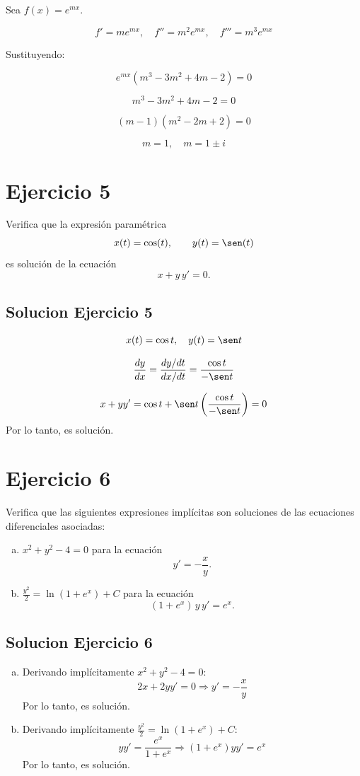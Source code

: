 \documentclass[12pt]{article}
\begin{document}
Sea $f(x)=e^{mx}$.

\[
f'=me^{mx},\quad f''=m^2e^{mx},\quad f'''=m^3e^{mx}
\]

Sustituyendo:

\[
e^{mx}(m^3-3m^2+4m-2)=0
\]

\[
m^3-3m^2+4m-2=0
\]

\[
(m-1)(m^2-2m+2)=0
\]

\[
\boxed{m=1,\quad m=1\pm i}
\]
\section*{Ejercicio 5}

Verifica que la expresión paramétrica
\[
x(t) = \cos(t), \qquad y(t) = \sen(t)
\]
es solución de la ecuación
\[
x + y\,y' = 0.
\]

\subsection*{Solucion Ejercicio 5}
\[
x(t)=\cos t,\quad y(t)=\sen t
\]

\[
\frac{dy}{dx}=\frac{dy/dt}{dx/dt}=\frac{\cos t}{-\sen t}
\]

\[
x + yy' = \cos t + \sen t\left(\frac{\cos t}{-\sen t}\right)=0
\]
Por lo tanto, es solución.

\section*{Ejercicio 6}

Verifica que las siguientes expresiones implícitas son soluciones de las ecuaciones diferenciales asociadas:

\begin{enumerate}[a)]
\item $x^2 + y^2 - 4 = 0$ para la ecuación
\[
y' = -\frac{x}{y}.
\]

\item $\displaystyle \frac{y^2}{2} = \ln(1 + e^x) + C$ para la ecuación
\[
(1 + e^x)\, y\, y' = e^x.
\]
\end{enumerate}

\subsection*{Solucion Ejercicio 6}

\begin{enumerate}[a)]
\item Derivando implícitamente $x^2 + y^2 - 4 = 0$:
\[
2x + 2y y' = 0 \Rightarrow y' = -\frac{x}{y}
\]
Por lo tanto, es solución.

\item Derivando implícitamente $\displaystyle \frac{y^2}{2} = \ln(1 + e^x) + C$:
\[
y y' = \frac{e^x}{1 + e^x} \Rightarrow (1 + e^x) y y' = e^x
\]
Por lo tanto, es solución.
\end{enumerate}
\end{document}
